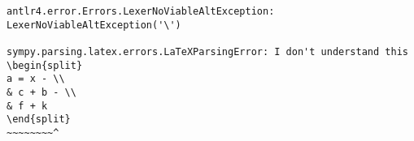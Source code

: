 \begin{verbatim}
antlr4.error.Errors.LexerNoViableAltException: LexerNoViableAltException('\')

sympy.parsing.latex.errors.LaTeXParsingError: I don't understand this
\begin{split}
a = x - \\
& c + b - \\
& f + k
\end{split}
~~~~~~~~^
\end{verbatim}